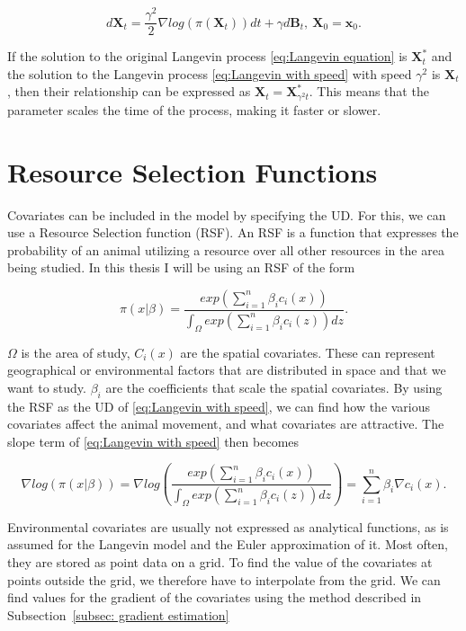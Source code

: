 \begin{equation}
    d\textbf{X}_t = \frac{\gamma^2}{2} \nabla log(\pi(\textbf{X}_t))dt + \gamma d\textbf{B}_t, \ \textbf{X}_0 = \textbf{x}_0.
    \label{eq:Langevin with speed}
\end{equation}


If the solution to the original Langevin process \eqref{eq:Langevin equation} is $\textbf{X}^*_t$ and the solution to the Langevin process \eqref{eq:Langevin with speed} with speed $\gamma^2$ is $\textbf{X}_t$, then their relationship can be expressed as $\textbf{X}_t = \textbf{X}^*_{\gamma^2 t}$. This means that the parameter scales the time of the process, making it faster or slower.


\section{Resource Selection Functions}

Covariates can be included in the model by specifying the UD. For this, we can use a Resource Selection function (RSF). An RSF is a function that expresses the probability of an animal utilizing a resource over all other resources in the area being studied. In this thesis I will be using an RSF of the form


\begin{equation}
    \pi(x|\beta) = \frac{exp(\sum_{i=1}^n\beta_i c_i(x))}{\int_\Omega exp(\sum_{i=1}^n\beta_i c_i(z))dz}.
    \label{eq: resource selection function}
\end{equation}

$\Omega$ is the area of study, $C_i(x)$ are the spatial covariates. These can represent geographical or environmental factors that are distributed in space and that we want to study. $\beta_i$ are the coefficients that scale the spatial covariates. By using the RSF as the UD of \eqref{eq:Langevin with speed}, we can find how the various covariates affect the animal movement, and what covariates are attractive. The slope term of \eqref{eq:Langevin with speed} then becomes

\begin{equation}
    \nabla log(\pi(x|\beta)) = \nabla log(\frac{exp(\sum_{i=1}^n\beta_i c_i(x))}{\int_\Omega exp(\sum_{i=1}^n\beta_i c_i(z))dz}) =\sum_{i=1}^n \beta_i \nabla c_i(x).
\end{equation}



Environmental covariates are usually not expressed as analytical functions, as is assumed for the Langevin model and the Euler approximation of it. Most often, they are stored as point data on a grid. To find the value of the covariates at points outside the grid, we therefore have to interpolate from the grid. We can find values for the gradient of the covariates using the method described in Subsection~\ref{subsec: gradient estimation}


